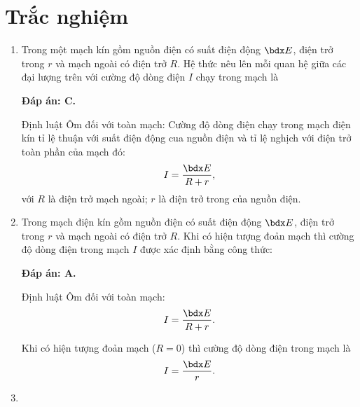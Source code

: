 \whiteBGstarBegin
\setcounter{section}{0}
\section{Trắc nghiệm}
\begin{enumerate}[label=\bfseries Câu \arabic*:]
	
	
	\item {}
	
	\cauhoi
	{Trong một mạch kín gồm nguồn điện có suất điện động $\calE$, điện trở trong $r$ và mạch ngoài có điện trở $R$. Hệ thức nêu lên mỗi quan hệ giữa các đại lượng trên với cường độ dòng điện $I$ chạy trong mạch là
		
	}
	\loigiai
	{	\textbf{Đáp án: C.}
		
		Định luật Ôm đối với toàn mạch: Cường độ dòng điện chạy trong mạch điện kín tỉ lệ thuận với suất điện động cua nguồn điện và tỉ lệ nghịch với điện trở toàn phần của mạch đó:
		$$I=\dfrac{\calE}{R+r},$$
		với $R$ là điện trở mạch ngoài; $r$ là điện trở trong của nguồn điện.
	}
	\item {}
	
	\cauhoi
	{Trong mạch điện kín gồm nguồn điện có suất điện động $\calE$, điện trở trong $r$ và mạch ngoài có điện trở $R$. Khi có hiện tượng đoản mạch thì cường độ dòng điện trong mạch $I$ được xác định bằng công thức:
		
	}
	\loigiai
	{	\textbf{Đáp án: A.}
		
		Định luật Ôm đối với toàn mạch:
		$$I=\dfrac{\calE}{R+r}.$$
		
		Khi có hiện tượng đoản mạch ($R=0$) thì cường độ dòng điện trong mạch là
		$$I=\dfrac{\calE}{r}.$$
	}
	\item {}
	

\end{enumerate}
